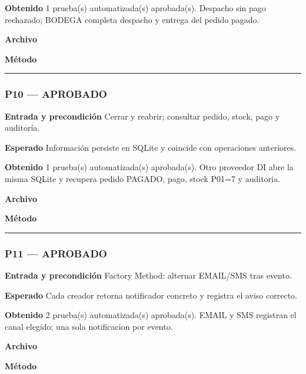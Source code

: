 \textbf{Obtenido} 1 prueba(s) automatizada(s) aprobada(s). Despacho sin pago rechazado; BODEGA completa despacho y entrega del pedido pagado.

\textbf{Archivo} \href{https://github.com/Alan77-bot/LogiMarket360Alan/blob/68bda51063441415524ede51bdf61649ee9b4973/tests/LogiMarket.Tests/Aplicacion/PermisosTests.cs}{}

\textbf{Método} 

\medskip\hrule\medskip
\subsubsection*{P10 --- APROBADO}
\textbf{Entrada y precondición} Cerrar y reabrir; consultar pedido, stock, pago y auditoría.

\textbf{Esperado} Información persiste en SQLite y coincide con operaciones anteriores.

\textbf{Obtenido} 1 prueba(s) automatizada(s) aprobada(s). Otro proveedor DI abre la misma SQLite y recupera pedido PAGADO, pago, stock P01=7 y auditoria.

\textbf{Archivo} \href{https://github.com/Alan77-bot/LogiMarket360Alan/blob/68bda51063441415524ede51bdf61649ee9b4973/tests/LogiMarket.Tests/Integracion/PersistenciaTests.cs}{}

\textbf{Método} 

\medskip\hrule\medskip
\subsubsection*{P11 --- APROBADO}
\textbf{Entrada y precondición} Factory Method: alternar EMAIL/SMS tras evento.

\textbf{Esperado} Cada creador retorna notificador concreto y registra el aviso correcto.

\textbf{Obtenido} 2 prueba(s) automatizada(s) aprobada(s). EMAIL y SMS registran el canal elegido; una sola notificacion por evento.

\textbf{Archivo} \href{https://github.com/Alan77-bot/LogiMarket360Alan/blob/68bda51063441415524ede51bdf61649ee9b4973/tests/LogiMarket.Tests/Integracion/OutboxTests.cs}{}

\textbf{Método} 

